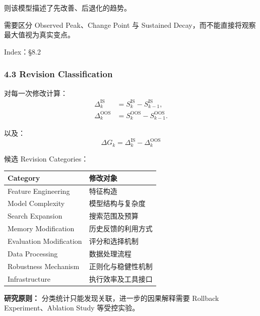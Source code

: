 则该模型描述了先改善、后退化的趋势。

需要区分 Observed Peak、Change Point 与 Sustained Decay，而不能直接将观察最大值视为真实变点。

Index：§8.2

\hypertarget{part-1-10-0001-revision-classification}{%
\subsubsection{4.3 Revision Classification}\label{part-1-10-0001-revision-classification}}

对每一次修改计算：
\[\begin{aligned}
\Delta_k^{\mathrm{IS}}
&=S_k^{\mathrm{IS}}-S_{k-1}^{\mathrm{IS}},\\
\Delta_k^{\mathrm{OOS}}
&=S_k^{\mathrm{OOS}}-S_{k-1}^{\mathrm{OOS}}.
\end{aligned}\]

以及：
\[\boxed{
\Delta G_k
=
\Delta_k^{\mathrm{IS}}
-
\Delta_k^{\mathrm{OOS}}
}\]


候选 Revision Categories：

\begin{readertable}
\begin{longtable}[]{@{}
  >{\raggedright\arraybackslash}p{}
  >{\raggedright\arraybackslash}p{}@{}}
\toprule
Category & 修改对象 \\
\midrule
\endhead
Feature Engineering & 特征构造 \\
Model Complexity & 模型结构与复杂度 \\
Search Expansion & 搜索范围及预算 \\
Memory Modification & 历史反馈的利用方式 \\
Evaluation Modification & 评分和选择机制 \\
Data Processing & 数据处理流程 \\
Robustness Mechanism & 正则化与稳健性机制 \\
Infrastructure & 执行效率及工具接口 \\
\bottomrule
\end{longtable}
\end{readertable}

\textbf{研究原则：} 分类统计只能发现关联，进一步的因果解释需要 Rollback Experiment、Ablation Study 等受控实验。

